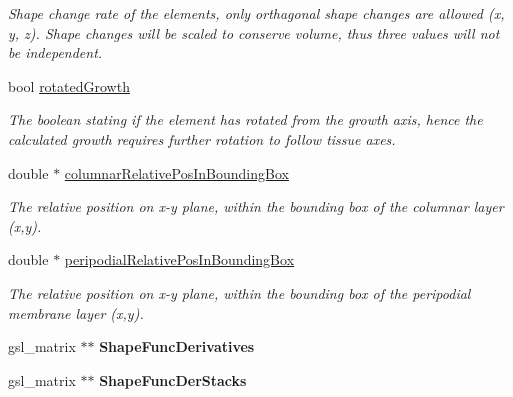 \begin{DoxyCompactItemize}
\begin{DoxyCompactList}\small\item\em Shape change rate of the elements, only orthagonal shape changes are allowed (x, y, z). Shape changes will be scaled to conserve volume, thus three values will not be independent. \end{DoxyCompactList}\item 
\hypertarget{classShapeBase_aee6a2cd267d49404f5442a48c867860f}{}bool \hyperlink{classShapeBase_aee6a2cd267d49404f5442a48c867860f}{rotated\+Growth}\label{classShapeBase_aee6a2cd267d49404f5442a48c867860f}

\begin{DoxyCompactList}\small\item\em The boolean stating if the element has rotated from the growth axis, hence the calculated growth requires further rotation to follow tissue axes. \end{DoxyCompactList}\item 
\hypertarget{classShapeBase_a3a88df07863ecf2a78fbd75543320edd}{}double $\ast$ \hyperlink{classShapeBase_a3a88df07863ecf2a78fbd75543320edd}{columnar\+Relative\+Pos\+In\+Bounding\+Box}\label{classShapeBase_a3a88df07863ecf2a78fbd75543320edd}

\begin{DoxyCompactList}\small\item\em The relative position on x-\/y plane, within the bounding box of the columnar layer (x,y). \end{DoxyCompactList}\item 
\hypertarget{classShapeBase_a3dfa65871a157645e733a4b01f1c8955}{}double $\ast$ \hyperlink{classShapeBase_a3dfa65871a157645e733a4b01f1c8955}{peripodial\+Relative\+Pos\+In\+Bounding\+Box}\label{classShapeBase_a3dfa65871a157645e733a4b01f1c8955}

\begin{DoxyCompactList}\small\item\em The relative position on x-\/y plane, within the bounding box of the peripodial membrane layer (x,y). \end{DoxyCompactList}\item 
\hypertarget{classShapeBase_a80a8943320a0cdc871565acded52b239}{}gsl\+\_\+matrix $\ast$$\ast$ {\bfseries Shape\+Func\+Derivatives}\label{classShapeBase_a80a8943320a0cdc871565acded52b239}

\item 
\hypertarget{classShapeBase_a23deaddf67b09f6fe5470f05385001fe}{}gsl\+\_\+matrix $\ast$$\ast$ {\bfseries Shape\+Func\+Der\+Stacks}\label{classShapeBase_a23deaddf67b09f6fe5470f05385001fe}


\end{DoxyCompactItemize}
